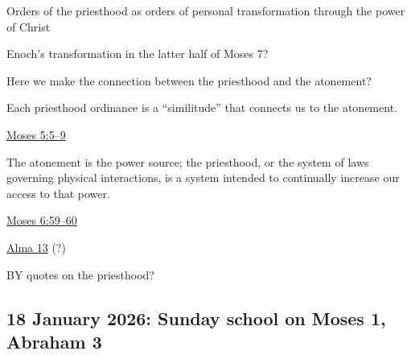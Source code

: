 \begin{compactitem}
			\item Orders of the priesthood as orders of personal transformation through the power of Christ
				\begin{compactitem}
					\item Enoch's transformation in the latter half of Moses 7?
					\item Here we make the connection between the priesthood and the atonement?
						\begin{compactitem}
							\item Each priesthood ordinance is a ``similitude'' that connects us to the atonement.
							\item \hyperref[MOSES-5-5]{Moses 5:5--9}
							\item The atonement is the power source; the priesthood, or the system of laws governing physical interactions, is a system intended to continually increase our access to that power.
							\item \hyperref[MOSES-6-59]{Moses 6:59--60}
							\item \hyperref[ALMA-13]{Alma 13} (?)
							\item BY quotes on the priesthood?
						\end{compactitem}
				\end{compactitem}
		
		\end{compactitem}
	
	\subsection{18 January 2026: Sunday school on Moses 1, Abraham 3}
		\label{TALKS-18-01-2026}
		
